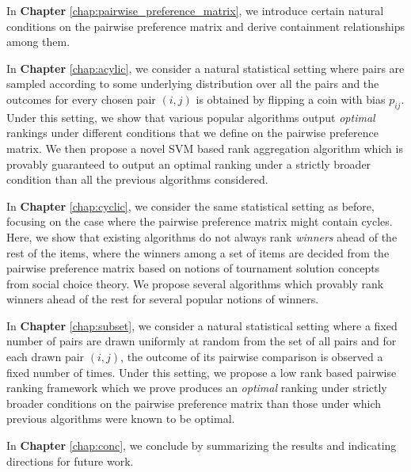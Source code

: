 \documentclass[12pt, twoside]{iiscthes}
\begin{document}
In \textbf{Chapter} \ref{chap:pairwise_preference_matrix}, we introduce certain natural conditions on the pairwise preference matrix and derive containment relationships among them.
 
In \textbf{Chapter} \ref{chap:acylic}, we consider a natural statistical setting where pairs are sampled according to some underlying distribution over all the pairs and the outcomes for every chosen pair $(i,j)$ is obtained by flipping a coin with bias $p_{ij}$. Under this setting, we show that various popular algorithms  output \emph{optimal} rankings under different conditions that we define on the pairwise preference matrix. We then propose a novel SVM based rank aggregation algorithm which is provably guaranteed to output an optimal ranking under a strictly broader condition than all the previous algorithms considered.

In \textbf{Chapter} \ref{chap:cyclic}, we consider the same statistical setting as before, focusing on the case where the pairwise preference matrix might contain cycles. Here, we show that existing algorithms do not always rank \emph{winners} ahead of the rest of the items, where the winners among a set of items are decided from the pairwise preference matrix based on notions of tournament solution concepts from social choice theory. We propose several algorithms which provably rank winners ahead of the rest for several popular notions of winners. 

In \textbf{Chapter} \ref{chap:subset}, we consider a natural statistical setting where a fixed number of pairs are drawn uniformly at random from the set of all pairs and for each drawn pair $(i,j)$, the outcome of its pairwise comparison is observed a fixed number of times. Under this setting, we propose a low rank based pairwise ranking framework which we prove produces an \emph{optimal} ranking under strictly broader conditions on the pairwise preference matrix than those under which previous algorithms were known to be optimal. 

In \textbf{Chapter} \ref{chap:conc}, we conclude by summarizing the results and indicating directions for future work.
\end{document}

